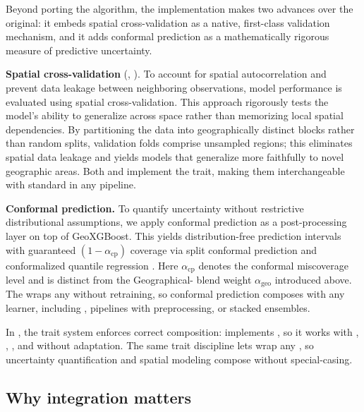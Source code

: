 \documentclass[article]{jss}
\newcommand{\fct}[1]{\code{#1()}}
\begin{document}
Beyond porting the algorithm, the  implementation makes two
advances over the original: it embeds spatial cross-validation as a native,
first-class validation mechanism, and it adds conformal prediction as a
mathematically rigorous measure of predictive uncertainty.

\textbf{Spatial cross-validation} (, ).
To account for spatial autocorrelation and prevent data leakage between
neighboring observations, model performance is evaluated using spatial
cross-validation. This approach rigorously tests the model's ability to
generalize across space rather than memorizing local spatial dependencies. By
partitioning the data into geographically distinct blocks rather than random
splits, validation folds comprise unsampled regions; this eliminates spatial
data leakage and yields models that generalize more faithfully to novel
geographic areas. Both  and 
implement the  trait, making them interchangeable with standard
 in any pipeline.

\textbf{Conformal prediction.} To quantify uncertainty without restrictive
distributional assumptions, we apply conformal prediction as a post-processing
layer on top of GeoXGBoost. This yields distribution-free prediction intervals
with guaranteed $(1-\alpha_{\mathrm{cp}})$ coverage via split conformal
prediction and conformalized quantile regression
\citep[CQR;][]{Romano+Patterson+Candes:2019}. Here $\alpha_{\mathrm{cp}}$
denotes the conformal miscoverage level and is distinct from the
Geographical- blend weight $\alpha_{\mathrm{geo}}$ introduced
above. The  wraps any  without
retraining, so conformal prediction composes with any learner, including
, pipelines with preprocessing, or stacked ensembles.

{\sloppy
In , the trait system enforces correct composition:
 implements , so it works with
\fct{benchmark}, , , and
 without adaptation. The same trait discipline lets
 wrap any , so uncertainty
quantification and spatial modeling compose without special-casing.\par}

\subsection{Why integration matters}
\end{document}
